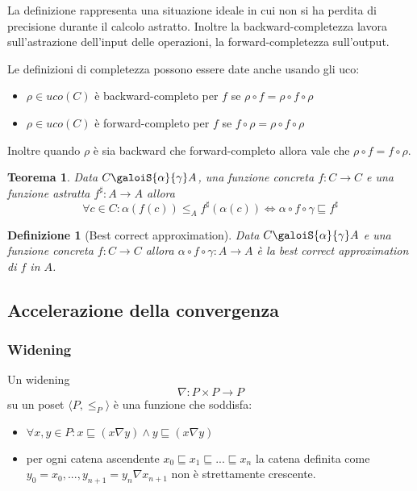 \documentclass[a4paper, 11pt]{article}
\newtheorem{definit}{Definizione}[subsection]
\newtheorem{thm}{Teorema}[subsection]
\begin{document}
	La definizione rappresenta una situazione ideale in cui non si ha perdita di precisione durante il calcolo astratto. Inoltre la backward-completezza lavora sull'astrazione dell'input delle operazioni, la forward-completezza sull'output.
	
	Le definizioni di completezza possono essere date anche usando gli uco: \begin{itemize}
		\item $\rho \in uco(C)$ è backward-completo per $f$ se $\rho \circ f = \rho \circ f \circ \rho$
		\item $\rho \in uco(C)$ è forward-completo per $f$ se $f \circ \rho = \rho \circ f \circ \rho$
	\end{itemize}

	Inoltre quando $\rho$ è sia backward che forward-completo allora vale che $\rho \circ f = f \circ \rho$.
	
	\begin{thm}
		Data $C \galoiS{\alpha}{\gamma} A$, una funzione concreta $f : C \to C$  e una funzione astratta $f^\sharp: A \to A$ allora  \[ \forall c \in C: \alpha(f(c)) \leq_A f^\sharp(\alpha(c)) \Leftrightarrow \alpha \circ f \circ \gamma \sqsubseteq f^\sharp \]
	\end{thm}

	\begin{definit}[Best correct approximation]
		Data $C \galoiS{\alpha}{\gamma} A$ e una funzione concreta $f : C \to C$ allora $\alpha \circ f \circ \gamma : A \to A$ è la best correct approximation di $f$ in $A$.
	\end{definit}

	\subsection{Accelerazione della convergenza}
	\subsubsection{Widening}
	Un widening \[ \nabla : P \times P \to P  \] su un poset $ \langle P, \leq_P \rangle $ è una funzione che soddisfa:
	\begin{itemize}
		\item $\forall x,y \in P : x \sqsubseteq (x \nabla y ) \wedge y \sqsubseteq (x \nabla y)$
		\item per ogni catena ascendente $x_0 \sqsubseteq x_1 \sqsubseteq ... \sqsubseteq x_n$ la catena definita come $y_0 = x_0, ..., y_{n+1} = y_n \nabla x_{n+1}$ non è strettamente crescente.
	\end{itemize}
	
\end{document}
